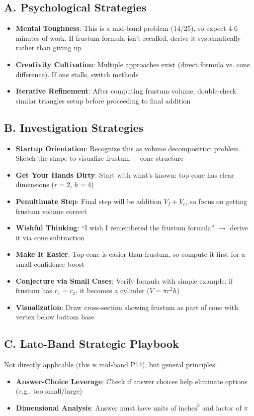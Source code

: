 \documentclass[]{article}
\begin{document}
\begin{strategicbox}
\subsection*{A. Psychological Strategies}
\begin{itemize}[leftmargin=*]
    \item \textbf{Mental Toughness}: This is a mid-band problem (14/25), so expect 4-6 minutes of work. If frustum formula isn't recalled, derive it systematically rather than giving up
    \item \textbf{Creativity Cultivation}: Multiple approaches exist (direct formula vs. cone difference). If one stalls, switch methods
    \item \textbf{Iterative Refinement}: After computing frustum volume, double-check similar triangles setup before proceeding to final addition
\end{itemize}

\subsection*{B. Investigation Strategies}
\begin{itemize}[leftmargin=*]
    \item \textbf{Startup Orientation}: Recognize this as volume decomposition problem. Sketch the shape to visualize frustum + cone structure
    \item \textbf{Get Your Hands Dirty}: Start with what's known: top cone has clear dimensions ($r=2$, $h=4$)
    \item \textbf{Penultimate Step}: Final step will be addition $V_f + V_c$, so focus on getting frustum volume correct
    \item \textbf{Wishful Thinking}: ``I wish I remembered the frustum formula'' $\rightarrow$ derive it via cone subtraction
    \item \textbf{Make It Easier}: Top cone is easier than frustum, so compute it first for a small confidence boost
    \item \textbf{Conjecture via Small Cases}: Verify formula with simple example: if frustum has $r_1=r_2$, it becomes a cylinder ($V=\pi r^2 h$)
    \item \textbf{Visualization}: Draw cross-section showing frustum as part of cone with vertex below bottom base
\end{itemize}

\subsection*{C. Late-Band Strategic Playbook}
Not directly applicable (this is mid-band P14), but general principles:
\begin{itemize}[leftmargin=*]
    \item \textbf{Answer-Choice Leverage}: Check if answer choices help eliminate options (e.g., too small/large)
    \item \textbf{Dimensional Analysis}: Answer must have units of $\text{inches}^3$ and factor of $\pi$
\end{itemize}


\end{strategicbox}
\end{document}
